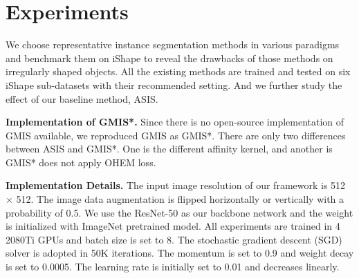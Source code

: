 \section{Experiments}

We choose representative instance segmentation methods in various paradigms and benchmark them on iShape to reveal the drawbacks of those methods on irregularly shaped objects. All the existing methods are trained and tested on six iShape sub-datasets with their recommended setting. And we further study the effect of our baseline method, ASIS. 

\textbf{Implementation of GMIS*.} Since there is no open-source implementation of GMIS \cite{liu2018affinity} available, we reproduced GMIS as GMIS*. There are only two differences between ASIS and GMIS*. One is the different affinity kernel, and another is GMIS* does not apply OHEM loss.


\textbf{Implementation Details.} The input image resolution of our framework is 512 $\times$ 512. The image data augmentation is flipped horizontally or vertically with a probability of 0.5. We use the ResNet-50 \cite{he2015deep} as our backbone network and the weight is initialized with ImageNet \cite{russakovsky2015imagenet} pretrained model. All experiments are trained in 4 2080Ti GPUs and batch size is set to 8. The stochastic gradient descent (SGD) solver is adopted in 50K iterations. The momentum is set to 0.9 and weight decay is set to 0.0005. The learning rate is initially set to 0.01 and decreases linearly. 

